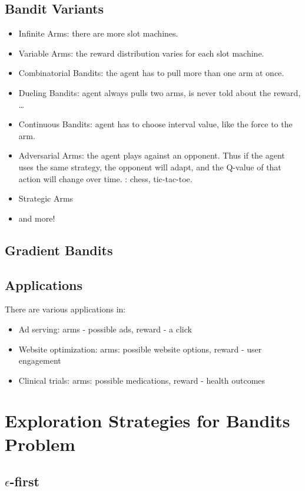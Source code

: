 \subsection{Bandit Variants}
\begin{itemize}
	\item Infinite Arms: there are more slot machines.
	\item Variable Arms: the reward distribution varies for each slot machine.
	\item Combinatorial Bandits: the agent has to pull more than one arm at once.
	\item Dueling Bandits: agent always pulls two arms, is never told about the reward, \dots
	\item Continuous Bandits: agent has to choose interval value, like the force to the arm.
	\item Adversarial Arms: the agent plays against an opponent. Thus if the agent uses the same strategy, the opponent will adapt, and the Q-value of that action will change over time. \Eg: chess, tic-tac-toe.
	\item Strategic Arms
	\item and more!
\end{itemize}

\subsection{Gradient Bandits}
\todo{}

\subsection{Applications}
There are various applications in:
\begin{itemize}
	\item Ad serving: arms - possible ads, reward - a click
	\item Website optimization: arms: possible website options, reward - user engagement
	\item Clinical trials: arms: possible medications, reward - health outcomes
\end{itemize}

\section{Exploration Strategies for Bandits Problem}
\subsection{$\epsilon$-first}
\todo{}


